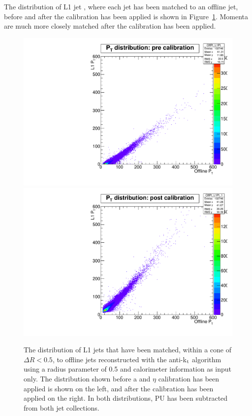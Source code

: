 The distribution of L1 jet \pt, where each jet has been matched to an offline jet, before and after the calibration has been applied is shown in Figure~\ref{prepostCalib}. 
Momenta are much more closely matched after the calibration has been applied.

\begin{figure}[t!]
\begin{center}
  \includegraphics[scale=0.32]{Figures/l1jets/PreCalib.pdf}
  \includegraphics[scale=0.32]{Figures/l1jets/PostCalib.pdf}
\caption{The \pt distribution of \ac{L1} jets that have been matched, within a cone of $\Delta R<0.5$, to offline jets reconstructed with the anti-k$_{\rm t}$ algorithm using a radius parameter of 0.5 and calorimeter information as input only. The distribution shown before a \pt and $\eta$ calibration has been applied is shown on the left, and after the calibration has been applied on the right. In both distributions, \ac{PU} has been subtracted from both jet collections. }
\label{prepostCalib}
\end{center}
\end{figure}




